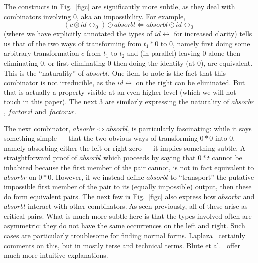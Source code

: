 \documentclass{article}
\newcommand{\absorbr}{\ensuremath{\mathit{absorbr}}}
\newcommand{\absorbl}{\ensuremath{\mathit{absorbl}}}
\newcommand{\factorzr}{\ensuremath{\mathit{factorzr}}}
\newcommand{\factorzl}{\ensuremath{\mathit{factorzl}}}
\newcommand{\idc}{\mathit{id}\!\!\leftrightarrow}
\newcommand{\jc}[1]{\fbox{Jacques says:} \textbf{#1}}
\begin{document}
The constructs in Fig.~\ref{figc} are significantly more subtle, as they
deal with combinators involving $0$, aka an impossibility.  For example,
\[  {(c \otimes \idc_{0}) \odot \absorbl \Leftrightarrow \absorbl \odot \idc_{0}}
\]
(where we have explicitly annotated the types of $\idc$ for increased clarity)
tells us that of the two ways of transforming from $t_1  *  0$ to $0$, 
namely first doing some arbitrary transformation $c$ from $t_1$ to $t_2$ and
(in parallel) leaving $0$ alone then eliminating $0$, or first eliminating $0$
then doing the identity (at $0$), are equivalent. This is the ``naturality'' of
$\absorbl$. One item to note is the fact that this combinator is not
irreducible, as the $\idc$ on the right can be eliminated. But that is actually
a property visible at an even higher level (which we will not touch in this
paper).  The next $3$ are similarly expressing the naturality of $\absorbr$,
$\factorzl$ and $\factorzr$.

The next combinator, $\absorbr \Leftrightarrow \absorbl$, is
particularly fascinating: while it says something simple --- that the
two obvious ways of transforming $0 * 0$ into $0$, namely absorbing
either the left or right zero --- it implies something subtle.  A
straightforward proof of $\absorbl$ which proceeds by saying that
$0 * t$ cannot be inhabited because the first member of the pair
cannot, is not in fact equivalent to $\absorbr$ on $0 * 0$.  However,
if we instead define $\absorbl$ to ``transport'' the putative
impossible first member of the pair to its (equally impossible)
output, then these do form equivalent pairs.  The next few in
Fig.~\ref{figc} also express how $\absorbr$ and $\absorbl$ interact
with other combinators. As seen previously, all of these arise as
critical pairs. What is much more subtle here is that the types
involved often are asymmetric: they do not have the same occurrences
on the left and right. Such cases are particularly troublesome for
finding normal forms. Laplaza~\cite{laplaza72} certainly comments on this,
but in mostly terse and technical terms. Blute et al.~\cite{BLUTE1996229}
offer much more intuitive explanations.

\end{document}
